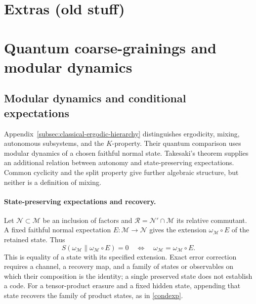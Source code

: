 \documentclass[a4paper,11pt]{article}
\theoremstyle{definition}
\begin{document}
 \section{Extras (old stuff)}



\section{Quantum coarse-grainings and modular dynamics}\label{app:quantum-coarse}
\subsection{Modular dynamics and conditional expectations}\label{subsec:quantum-ergodic}

Appendix~\ref{subsec:classical-ergodic-hierarchy} distinguishes ergodicity, mixing,
autonomous subsystems, and the $K$-property. Their quantum comparison uses modular
dynamics of a chosen faithful normal state. Takesaki's theorem supplies an additional
relation between autonomy and state-preserving expectations. Common cyclicity and
the split property give further algebraic structure, but neither is a definition of mixing.


\paragraph{State-preserving expectations and recovery.}
Let $\mathcal N\subset\mathcal M$ be an inclusion of factors and
$\mathcal R=\mathcal N'\cap\mathcal M$ its relative commutant.
A fixed faithful normal expectation $E:\mathcal M\to\mathcal N$ gives the extension
$\omega_{\mathcal M}\circ E$ of the retained state. Thus
\begin{equation}
 S(\omega_{\mathcal M}\|\omega_{\mathcal M}\circ E)=0
 \quad\Longleftrightarrow\quad \omega_{\mathcal M}=\omega_{\mathcal M}\circ E.
 \label{eq:QEC-entropy}
\end{equation}
This is equality of a state with its specified extension. Exact error correction
requires a channel, a recovery map, and a family of states or observables on which
their composition is the identity; a single preserved state does not establish a code.
For a tensor-product erasure and a fixed hidden state, appending that state
recovers the family of product states, as in \eqref{condexp}.
\end{document}
